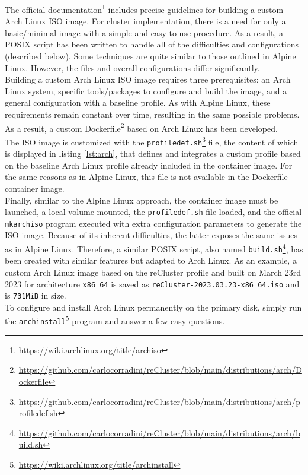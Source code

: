 The official documentation\footnote{\url{https://wiki.archlinux.org/title/archiso}}
includes precise guidelines for building a custom Arch Linux ISO image. For cluster
implementation, there is a need for only a basic/minimal image with a simple and
easy-to-use procedure. As a result, a POSIX script has been written to handle
all of the difficulties and configurations (described below). Some techniques are
quite similar to those outlined in Alpine Linux. However, the files and overall configurations
differ significantly. \\ %
Building a custom Arch Linux ISO image requires three prerequisites: an Arch
Linux system, specific tools/packages to configure and build the image, and a
general configuration with a baseline profile. As with Alpine Linux, these
requirements remain constant over time, resulting in the same possible problems.
As a result, a custom Dockerfile\footnote{\url{https://github.com/carlocorradini/reCluster/blob/main/distributions/arch/Dockerfile}}
based on Arch Linux has been developed. \\ %
The ISO image is customized with the \texttt{profiledef.sh}\footnote{\url{https://github.com/carlocorradini/reCluster/blob/main/distributions/arch/profiledef.sh}}
file, the content of which is displayed in listing \ref{lst:arch}, that defines
and integrates a custom profile based on the baseline Arch Linux profile already
included in the container image. For the same reasons as in Alpine Linux, this
file is not available in the Dockerfile container image. \\ %
Finally, similar to the Alpine Linux approach, the container image must be
launched, a local volume mounted, the \texttt{profiledef.sh} file loaded, and
the official \texttt{mkarchiso} program executed with extra configuration parameters
to generate the ISO image. Because of its inherent difficulties, the latter exposes
the same issues as in Alpine Linux. Therefore, a similar POSIX script, also
named \texttt{build.sh}\footnote{\url{https://github.com/carlocorradini/reCluster/blob/main/distributions/arch/build.sh}},
has been created with similar features but adapted to Arch Linux. As an example,
a custom Arch Linux image based on the reCluster profile and built on March 23rd
2023 for architecture \texttt{x86\_64} is saved as \texttt{reCluster-2023.03.23-x86\_64.iso}
and is \texttt{731MiB} in size. \\ %
To configure and install Arch Linux permanently on the primary disk, simply run
the \texttt{archinstall}\footnote{\url{https://wiki.archlinux.org/title/archinstall}}
program and answer a few easy questions.

